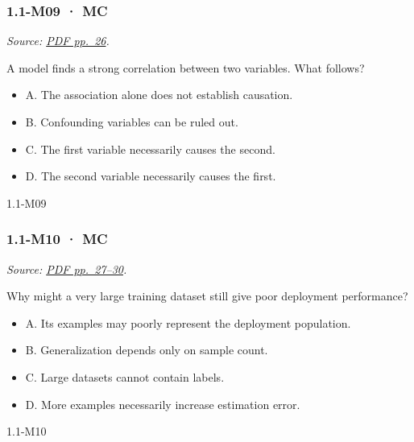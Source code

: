 \noindent\begin{minipage}{\linewidth}

\subsubsection{1.1-M09 · MC}\label{m09-mc}

\emph{Source:
\href{../Lecture\%20Slides/1.1.\%20Fundamentals.pdf\#page=26}{PDF
pp.~26}.}

A model finds a strong correlation between two variables. What follows?

\begin{itemize}
\tightlist
\item
  A. The association alone does not establish causation.
\item
  B. Confounding variables can be ruled out.
\item
  C. The first variable necessarily causes the second.
\item
  D. The second variable necessarily causes the first.
\end{itemize}

\begin{solution}[8mm]{1.1-M09}

\end{solution}
\end{minipage}\par\medskip

\noindent\begin{minipage}{\linewidth}

\subsubsection{1.1-M10 · MC}\label{m10-mc}

\emph{Source:
\href{../Lecture\%20Slides/1.1.\%20Fundamentals.pdf\#page=27}{PDF
pp.~27--30}.}

Why might a very large training dataset still give poor deployment
performance?

\begin{itemize}
\tightlist
\item
  A. Its examples may poorly represent the deployment population.
\item
  B. Generalization depends only on sample count.
\item
  C. Large datasets cannot contain labels.
\item
  D. More examples necessarily increase estimation error.
\end{itemize}

\begin{solution}[8mm]{1.1-M10}

\end{solution}
\end{minipage}\par\medskip

